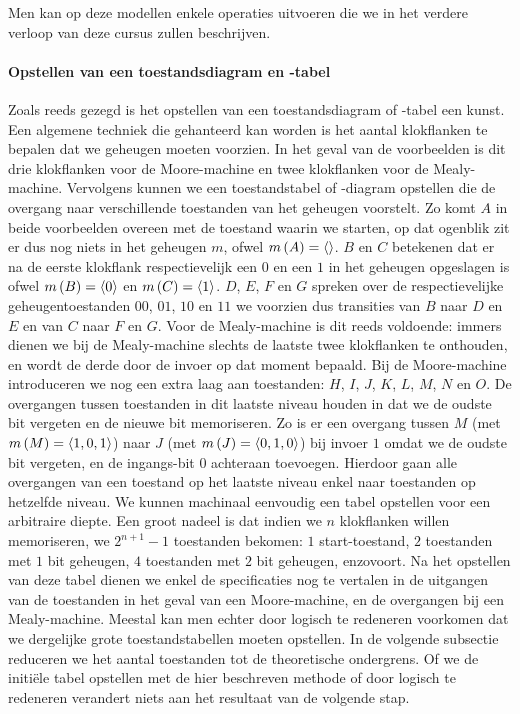 Men kan op deze modellen enkele operaties uitvoeren die we in het verdere verloop van deze cursus zullen beschrijven.

\paragraph{Opstellen van een toestandsdiagram en -tabel}
Zoals reeds gezegd is het opstellen van een toestandsdiagram of -tabel een kunst. Een algemene techniek die gehanteerd kan worden is het aantal klokflanken te bepalen dat we geheugen moeten voorzien.  In het geval van de voorbeelden is dit drie klokflanken voor de Moore-machine en twee klokflanken voor de Mealy-machine. Vervolgens kunnen we een toestandstabel of -diagram opstellen die de overgang naar verschillende toestanden van het geheugen voorstelt. Zo komt $A$ in beide voorbeelden overeen met de toestand waarin we starten, op dat ogenblik zit er dus nog niets in het geheugen $m$, ofwel $m\left( A \right)=\left\langle  \right\rangle$. $B$ en $C$ betekenen dat er na de eerste klokflank respectievelijk een $0$ en een $1$ in het geheugen opgeslagen is ofwel $m\left( B \right)=\left\langle 0 \right\rangle$ en $m\left( C \right)=\left\langle 1 \right\rangle$. $D$, $E$, $F$ en $G$ spreken over de respectievelijke geheugentoestanden $00$, $01$, $10$ en $11$ we voorzien dus transities van $B$ naar $D$ en $E$ en van $C$ naar $F$ en $G$. Voor de Mealy-machine is dit reeds voldoende: immers dienen we bij de Mealy-machine slechts de laatste twee klokflanken te onthouden, en wordt de derde door de invoer op dat moment bepaald. Bij de Moore-machine introduceren we nog een extra laag aan toestanden: $H$, $I$, $J$, $K$, $L$, $M$, $N$ en $O$. De overgangen tussen toestanden in dit laatste niveau houden in dat we de oudste bit vergeten en de nieuwe bit memoriseren. Zo is er een overgang tussen $M$ (met $m\left( M \right)=\left\langle 1,0,1 \right\rangle$) naar $J$ (met $m\left( J \right)=\left\langle 0,1,0 \right\rangle$) bij invoer $1$ omdat we de oudste bit vergeten, en de ingangs-bit $0$ achteraan toevoegen. Hierdoor gaan alle overgangen van een toestand op het laatste niveau enkel naar toestanden op hetzelfde niveau. We kunnen machinaal eenvoudig een tabel opstellen voor een arbitraire diepte. Een groot nadeel is dat indien we $n$ klokflanken willen memoriseren, we $2^{n+1}-1$ toestanden bekomen: $1$ start-toestand, $2$ toestanden met $1$ bit geheugen, $4$ toestanden met $2$ bit geheugen, enzovoort. Na het opstellen van deze tabel dienen we enkel de specificaties nog te vertalen in de uitgangen van de toestanden in het geval van een Moore-machine, en de overgangen bij een Mealy-machine. Meestal kan men echter door logisch te redeneren voorkomen dat we dergelijke grote toestandstabellen moeten opstellen. In de volgende subsectie reduceren we het aantal toestanden tot de theoretische ondergrens. Of we de initi\"ele tabel opstellen met de hier beschreven methode of door logisch te redeneren verandert niets aan het resultaat van de volgende stap.

